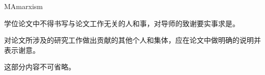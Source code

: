 
\begin{acknowledgment}{MAmarxism}

学位论文中不得书写与论文工作无关的人和事，对导师的致谢要实事求是。

对论文所涉及的研究工作做出贡献的其他个人和集体，应在论文中做明确的说明并表示谢意。

这部分内容不可省略。

\end{acknowledgment}


